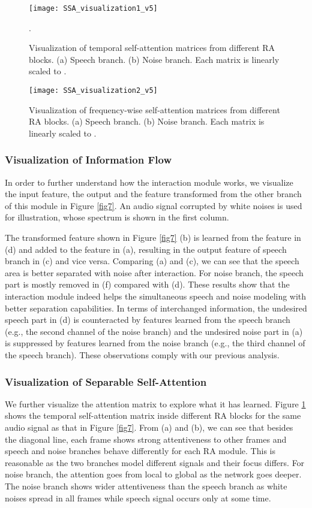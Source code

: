 \documentclass[letterpaper]{article} \usepackage{snnet}  \usepackage{times}  \usepackage{helvet} \usepackage{courier}  \usepackage[hyphens]{url}  \usepackage{graphicx} \urlstyle{rm} \def\UrlFont{\rm}  \usepackage{graphicx}  \usepackage{natbib}  \usepackage{caption} \usepackage{amsfonts}  \usepackage{amsmath}  \usepackage{multirow} \usepackage{tablefootnote}  \usepackage[switch]{lineno}
\begin{document}
\begin{figure}[t]
    \centering
    \texttt{[image: SSA\_visualization1\_v5]}
    \caption{Visualization of temporal self-attention matrices from different RA blocks. (a) Speech branch. (b) Noise branch. Each matrix is linearly scaled to .}.
    \label{fig5}
\end{figure}

\begin{figure}[t]
    \centering
    \texttt{[image: SSA\_visualization2\_v5]}
    \caption{Visualization of frequency-wise self-attention matrices from different RA blocks. (a) Speech branch. (b) Noise branch. Each matrix is linearly scaled to .}
    \label{fig6}
\end{figure}

\subsubsection{Visualization of Information Flow}
In order to further understand how the interaction module works, we visualize the input feature, the output and the feature transformed from the other branch of this module in Figure \ref{fig7}. An audio signal corrupted by white noises is used for illustration, whose spectrum is shown in the first column.

The transformed feature shown in Figure \ref{fig7} (b) is learned from the feature in (d) and added to the feature in (a), resulting in the output feature of speech branch in (c) and vice versa. Comparing (a) and (c), we can see that the speech area is better separated with noise after interaction. For noise branch, the speech part is mostly removed in (f) compared with (d). These results show that the interaction module indeed helps the simultaneous speech and noise modeling with better separation capabilities. In terms of interchanged information, the undesired speech part in (d) is counteracted by features learned from the speech branch (e.g., the second channel of the noise branch) and the undesired noise part in (a) is suppressed by features learned from the noise branch (e.g., the third channel of the speech branch). These observations comply with our previous analysis.

\subsubsection{Visualization of Separable Self-Attention}
We further visualize the attention matrix to explore what it has learned. Figure \ref{fig5} shows the temporal self-attention matrix inside different RA blocks for the same audio signal as that in Figure \ref{fig7}. From (a) and (b), we can see that besides the diagonal line, each frame shows strong attentiveness to other frames and speech and noise branches behave differently for each RA module. This is reasonable as the two branches model different signals and their focus differs. For noise branch, the attention goes from local to global as the network goes deeper. The noise branch shows wider attentiveness than the speech branch as white noises spread in all frames while speech signal occurs only at some time.
\end{document}
